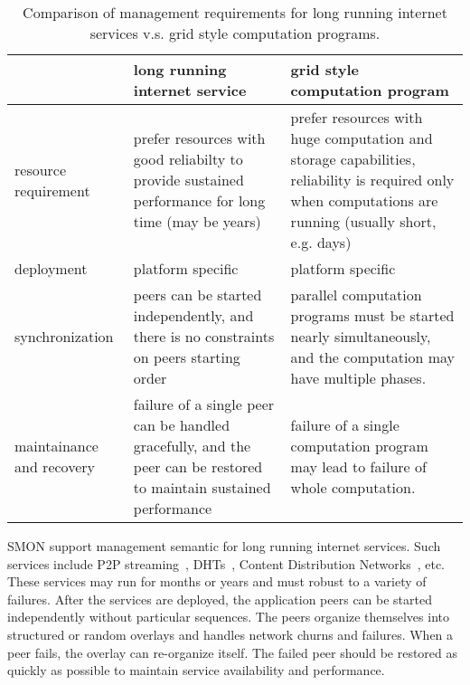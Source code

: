 \begin{table*}
\small
\centering
\begin{tabular}{|l|p{5cm}|p{5cm}|}

\hline

 & long running internet service & grid style computation
 program \\

\hline

resource requirement & prefer resources with good
reliabilty to provide sustained performance for long time
(may be years) & prefer
 resources with huge computation and storage capabilities,
 reliability is required only when computations are running
 (usually short, e.g. days) \\

\hline

deployment & platform specific & platform specific \\

\hline

synchronization & peers can be started independently, and there
is no constraints on peers starting order &
parallel computation programs must be started nearly
simultaneously, and the computation may have multiple
phases.\\

\hline

maintainance and recovery & failure of a single peer can be
handled gracefully, and the peer can be restored to maintain
sustained performance &
failure of a single computation program may lead to failure
of whole computation.\\

\hline

\end{tabular}
\caption{Comparison of management requirements for long
running internet services v.s. grid style computation
programs.}
\label{fig:app-man-req}
\end{table*}


SMON support management semantic for long running
internet services. Such services include P2P
streaming~\cite{xxx}, DHTs~\cite{xxx}, Content Distribution
Networks~\cite{xxx}, etc. These services may run for months
or years and must robust to a variety of failures. After the
services are deployed, the application peers can be started
independently without particular sequences. The peers
organize themselves into structured or random overlays and
handles network churns and failures. When a peer fails, the
overlay can re-organize itself. The failed peer should be
restored as quickly as possible to maintain service
availability and performance.

